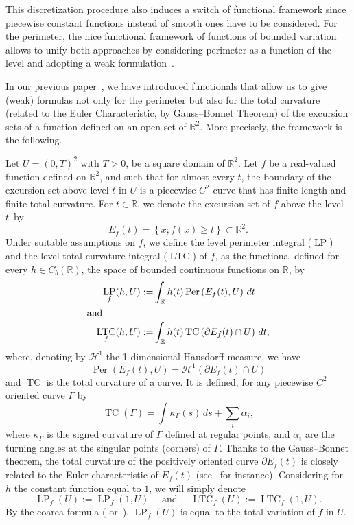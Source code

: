 \documentclass[AHL,Unicode,longabstracts,published]{cedram}
\newcommand{\R}{\mathbb{R}}
\DeclareMathOperator{\TC}{TC}
\DeclareMathOperator{\LTC}{LTC}
\DeclareMathOperator{\LP}{LP}
\DeclareMathOperator{\Per}{Per}
\newcommand{\calH}{\mathcal{H}}
\begin{document}
This discretization procedure also induces a switch of functional framework since piecewise constant functions instead of smooth ones have to be considered. For the perimeter, the nice functional framework of functions of bounded variation~\cite{AmbrosioFP} allows to unify both approaches by considering perimeter as a function of the level and adopting a weak formulation~\cite{BD-A0P-2016}.



In our previous paper~\cite{BD-Geometry-published}, we have introduced functionals that allow us to give (weak) formulas not only for the perimeter but also for the total curvature (related to the Euler Characteristic, by Gauss--Bonnet Theorem) of the excursion sets of a function defined on an open set of $\R^2$. More precisely, the framework is the following.


Let $U=(0,T)^2$ with $T>0$, be a square domain of $\R^2$. Let $f$ be a real-valued function defined on $\R^2$, and such that for almost every $t$, the boundary of the excursion set above level $t$ in $U$ is a piecewise $C^2$ curve that has finite length and finite total curvature. For $t\in\R$, we denote the excursion set of $f$ above the level~$t$~by
\[
E_f(t) =\left\{ x ; f(x) \geq t \right\} \subset \R^2.
\]
Under suitable assumptions on $f$, we define the level perimeter integral ($\LP$) and the level total curvature integral ($\LTC$) of $f$, as the functional defined for every $h\in C_b(\R)$, the space of bounded continuous functions on $\R$, by
\begin{align*}
\LP_f(h,U) :=& \int_\R h(t) \Per \left(E_f(t),U\right) \, dt \\
\intertext{and}
\quad \LTC_f(h,U) :=& \int_\R h(t) \TC \left(\partial E_f(t)\cap U\right) \, dt,
\end{align*}
where, denoting by $\calH^1$ the 1-dimensional Hausdorff measure, we have
\[
\Per \left(E_f(t),U\right)=\calH^1\left(\partial E_f(t)\cap U\right)
\]
and $\TC$ is the total curvature of a curve. It is defined, for any piecewise $C^2$ oriented curve $\Gamma$ by
\[
\TC(\Gamma) = \int \kappa_\Gamma (s) \, ds + \sum_i \alpha_i,
\]
where $\kappa_\Gamma$ is the signed curvature of $\Gamma$ defined at regular points, and $\alpha_i$ are the turning angles at the singular points (corners) of $\Gamma$. Thanks to the Gauss--Bonnet theorem, the total curvature of the positively oriented curve $\partial E_f(t)$ is closely related to the Euler characteristic of $E_f(t)$ (see~\cite[p.~274]{DoCarmo} for instance). Considering for $h$ the constant function equal to $1$, we will simply denote
\[
\LP_f(U) := \LP_f(1,U) \quad \text{ and } \quad \LTC_f(U) :=
\LTC_f(1,U).
\]
By the coarea formula (\cite{AmbrosioFP} or~\cite{EvansGariepy}), $\LP_f(U)$ is equal to the total variation of $f$ in $U$.
\end{document}
